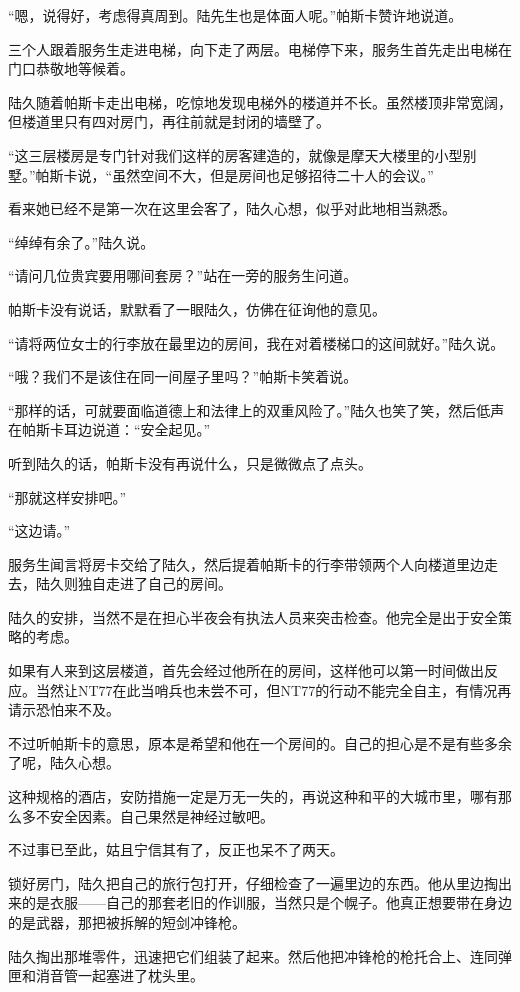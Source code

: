 “嗯，说得好，考虑得真周到。陆先生也是体面人呢。”帕斯卡赞许地说道。

三个人跟着服务生走进电梯，向下走了两层。电梯停下来，服务生首先走出电梯在门口恭敬地等候着。

陆久随着帕斯卡走出电梯，吃惊地发现电梯外的楼道并不长。虽然楼顶非常宽阔，但楼道里只有四对房门，再往前就是封闭的墙壁了。

“这三层楼房是专门针对我们这样的房客建造的，就像是摩天大楼里的小型别墅。”帕斯卡说，“虽然空间不大，但是房间也足够招待二十人的会议。”

看来她已经不是第一次在这里会客了，陆久心想，似乎对此地相当熟悉。

“绰绰有余了。”陆久说。

“请问几位贵宾要用哪间套房？”站在一旁的服务生问道。

帕斯卡没有说话，默默看了一眼陆久，仿佛在征询他的意见。

“请将两位女士的行李放在最里边的房间，我在对着楼梯口的这间就好。”陆久说。

“哦？我们不是该住在同一间屋子里吗？”帕斯卡笑着说。

“那样的话，可就要面临道德上和法律上的双重风险了。”陆久也笑了笑，然后低声在帕斯卡耳边说道：“安全起见。”

听到陆久的话，帕斯卡没有再说什么，只是微微点了点头。

“那就这样安排吧。”

“这边请。”

服务生闻言将房卡交给了陆久，然后提着帕斯卡的行李带领两个人向楼道里边走去，陆久则独自走进了自己的房间。

陆久的安排，当然不是在担心半夜会有执法人员来突击检查。他完全是出于安全策略的考虑。

如果有人来到这层楼道，首先会经过他所在的房间，这样他可以第一时间做出反应。当然让NT77在此当哨兵也未尝不可，但NT77的行动不能完全自主，有情况再请示恐怕来不及。

不过听帕斯卡的意思，原本是希望和他在一个房间的。自己的担心是不是有些多余了呢，陆久心想。

这种规格的酒店，安防措施一定是万无一失的，再说这种和平的大城市里，哪有那么多不安全因素。自己果然是神经过敏吧。

不过事已至此，姑且宁信其有了，反正也呆不了两天。

锁好房门，陆久把自己的旅行包打开，仔细检查了一遍里边的东西。他从里边掏出来的是衣服——自己的那套老旧的作训服，当然只是个幌子。他真正想要带在身边的是武器，那把被拆解的短剑冲锋枪。

陆久掏出那堆零件，迅速把它们组装了起来。然后他把冲锋枪的枪托合上、连同弹匣和消音管一起塞进了枕头里。

